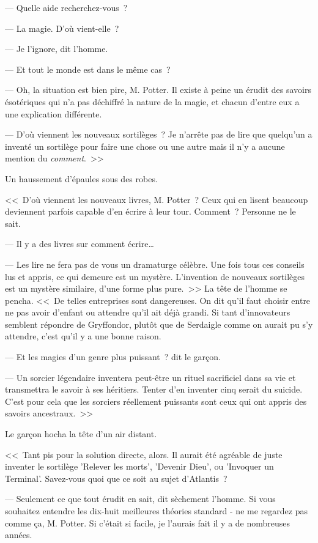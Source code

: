 --- Quelle aide recherchez-vous~?

--- La magie. D'où vient-elle~?

--- Je l'ignore, dit l'homme.

--- Et tout le monde est dans le même cas~?

--- Oh, la situation est bien pire, M. Potter. Il existe à peine un érudit des savoirs ésotériques qui n'a pas déchiffré la nature de la magie, et chacun d'entre eux a une explication différente.

--- D'où viennent les nouveaux sortilèges~? Je n'arrête pas de lire que quelqu'un a inventé un sortilège pour faire une chose ou une autre mais il n'y a aucune mention du \emph{comment}.~>>

Un haussement d'épaules sous des robes.

<<~D'où viennent les nouveaux livres, M. Potter~? Ceux qui en lisent beaucoup deviennent parfois capable d'en écrire à leur tour. Comment~? Personne ne le sait.

--- Il y a des livres sur comment écrire…

--- Les lire ne fera pas de vous un dramaturge célèbre. Une fois tous ces conseils lus et appris, ce qui demeure est un mystère. L'invention de nouveaux sortilèges est un mystère similaire, d'une forme plus pure.~>> La tête de l'homme se pencha. <<~De telles entreprises sont dangereuses. On dit qu'il faut choisir entre ne pas avoir d'enfant ou attendre qu'il ait déjà grandi. Si tant d'innovateurs semblent répondre de Gryffondor, plutôt que de Serdaigle comme on aurait pu s'y attendre, c'est qu'il y a une bonne raison.

--- Et les magies d'un genre plus puissant~? dit le garçon.

--- Un sorcier légendaire inventera peut-être un rituel sacrificiel dans sa vie et transmettra le savoir à ses héritiers. Tenter d'en inventer cinq serait du suicide. C'est pour cela que les sorciers réellement puissants sont ceux qui ont appris des savoirs ancestraux.~>>

Le garçon hocha la tête d'un air distant.

<<~Tant pis pour la solution directe, alors. Il aurait été agréable de juste inventer le sortilège 'Relever les morts', 'Devenir Dieu', ou 'Invoquer un Terminal'. Savez-vous quoi que ce soit au sujet d'Atlantis~?

--- Seulement ce que tout érudit en sait, dit sèchement l'homme. Si vous souhaitez entendre les dix-huit meilleures théories standard - ne me regardez pas comme ça, M. Potter. Si c'était si facile, je l'aurais fait il y a de nombreuses années.

